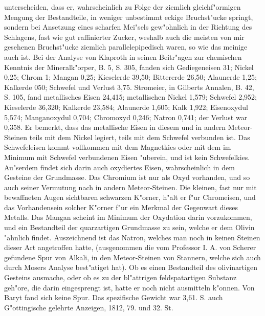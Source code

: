 \documentclass[a4paper, 11pt, oneside, polutonikogreek, german]{article}
\begin{document}
unterscheiden, dass er, wahrscheinlich zu Folge der ziemlich gleichf"ormigen Mengung der Bestandteile, in weniger unbestimmt eckige Bruchst"ucke springt, sondern bei Ansetzung eines scharfen Mei"sels gew"ohnlich in der Richtung des Schlagens, fast wie gut raffinierter Zucker, weshalb auch die meisten von mir gesehenen Bruchst"ucke ziemlich parallelepipedisch waren, so wie das meinige auch ist. Bei der Analyse von Klaproth in seinen Beitr"agen zur chemischen Kenntnis der Mineralk"orper, B. 5, S. 305, fanden sich Gediegeneisen 31; Nickel 0,25; Chrom 1; Mangan 0,25; Kieselerde 39,50; Bittererde 26,50; Alaunerde 1,25; Kalkerde 050; Schwefel und Verlust 3,75. Stromeier, in Gilberts Annalen, B. 42, S. 105, fand metallisches Eisen 24,415; metallischen Nickel 1,579; Schwefel 2,952; Kieselerde 36,320; Kalkerde 23,584; Alaunerde 1,605; Kalk 1,922; Eisenoxydul 5,574; Manganoxydul 0,704; Chromoxyd 0,246; Natron 0,741; der Verlust war 0,358. Er bemerkt, dass das metallische Eisen in diesem und in andern Meteor-Steinen teils mit dem Nickel legiert, teils mit dem Schwefel verbunden ist. Das Schwefeleisen kommt vollkommen mit dem Magnetkies oder mit dem im Minimum mit Schwefel verbundenen Eisen "uberein, und ist kein Schwefelkies. Au"serdem findet sich darin auch oxydiertes Eisen, wahrscheinlich in dem Gesteine der Grundmasse. Das Chromium ist nur als Oxyd vorhanden, und so auch seiner Vermutung nach in andern Meteor-Steinen. Die kleinen, fast nur mit bewaffneten Augen sichtbaren schwarzen K"orner, h"alt er f"ur Chromeisen, und das Vorhandensein solcher K"orner f"ur ein Merkmal der Gegenwart dieses Metalls. Das Mangan scheint im Minimum der Oxydation darin vorzukommen, und ein Bestandteil der quarzartigen Grundmasse zu sein, welche er dem Olivin "ahnlich findet. Auszeichnend ist das Natron, welches man noch in keinen Steinen dieser Art angetroffen hatte, (ausgenommen die vom Professor I. A. von Scherer gefundene Spur von Alkali, in den Meteor-Steinen von Stannern, welche sich auch durch Mosers Analyse best"atiget hat). Ob es einen Bestandteil des olivinartigen Gesteins ausmache, oder ob es zu der bl"attrigen feldspatartigen Substanz geh"ore, die darin eingesprengt ist, hatte er noch nicht ausmitteln k"onnen. Von Baryt fand sich keine Spur. Das spezifische Gewicht war 3,61. S. auch G"ottingische gelehrte Anzeigen, 1812, 79. und 32. St.
\end{document}
